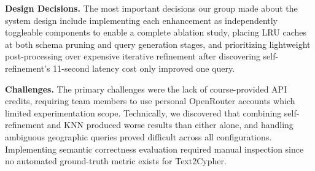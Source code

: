 \documentclass[sigconf]{acmart}
\begin{document}
\textbf{Design Decisions.} The most important decisions our group made about the system design include implementing each enhancement as independently toggleable components to enable a complete ablation study, placing LRU caches at both schema pruning and query generation stages, and prioritizing lightweight post-processing over expensive iterative refinement after discovering self-refinement's 11-second latency cost only improved one query.

\textbf{Challenges.} The primary challenges were the lack of course-provided API credits, requiring team members to use personal OpenRouter accounts which limited experimentation scope. Technically, we discovered that combining self-refinement and KNN produced worse results than either alone, and handling ambiguous geographic queries proved difficult across all configurations. Implementing semantic correctness evaluation required manual inspection since no automated ground-truth metric exists for Text2Cypher.






\end{document}
